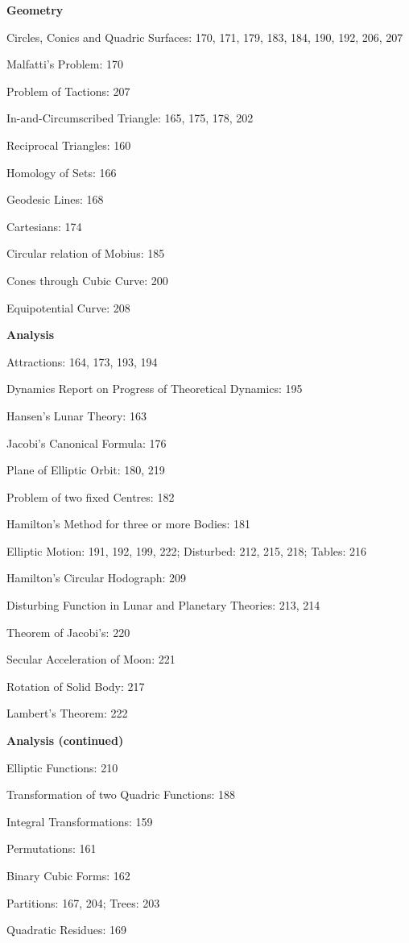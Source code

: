 \documentclass[12pt,a4paper]{article}
\theoremstyle{plain}
\begin{document}
\textbf{Geometry}

Circles, Conics and Quadric Surfaces: 170, 171, 179, 183, 184, 190, 192, 206, 207

Malfatti's Problem: 170

Problem of Tactions: 207

In-and-Circumscribed Triangle: 165, 175, 178, 202

Reciprocal Triangles: 160

Homology of Sets: 166

Geodesic Lines: 168

Cartesians: 174

Circular relation of Mobius: 185

Cones through Cubic Curve: 200

Equipotential Curve: 208

\bigskip
\textbf{Analysis}

Attractions: 164, 173, 193, 194

Dynamics Report on Progress of Theoretical Dynamics: 195

Hansen's Lunar Theory: 163

Jacobi's Canonical Formula: 176

Plane of Elliptic Orbit: 180, 219

Problem of two fixed Centres: 182

Hamilton's Method for three or more Bodies: 181

Elliptic Motion: 191, 192, 199, 222; Disturbed: 212, 215, 218; Tables: 216

Hamilton's Circular Hodograph: 209

Disturbing Function in Lunar and Planetary Theories: 213, 214

Theorem of Jacobi's: 220

Secular Acceleration of Moon: 221

Rotation of Solid Body: 217

Lambert's Theorem: 222

\bigskip
\textbf{Analysis (continued)}

Elliptic Functions: 210

Transformation of two Quadric Functions: 188

Integral Transformations: 159

Permutations: 161

Binary Cubic Forms: 162

Partitions: 167, 204; Trees: 203

Quadratic Residues: 169
\end{document}
